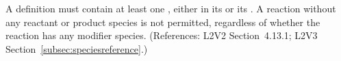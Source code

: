A \Reaction definition must contain at least one \SpeciesReference, either
in its  or its .  A reaction
without any reactant or product species is not permitted, regardless of
whether the reaction has any modifier species.  (References: L2V2
Section~4.13.1; L2V3 Section~\ref{subsec:speciesreference}.)
